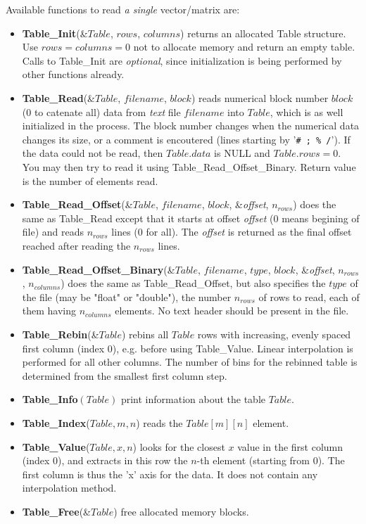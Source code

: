 Available functions to read \emph{a single} vector/matrix are:
\begin{itemize}
\item {\bf Table\_Init}(\&$Table$, $rows$, $columns$) returns an allocated
  Table structure. Use $rows=columns=0$ not to allocate memory and return an empty table.
  Calls to Table\_Init are \emph{optional}, since initialization is being
  performed by other functions already.
\item {\bf Table\_Read}(\&$Table$, $filename$, $block$)
  reads numerical block number
  $block$ (0 to catenate all) data from \emph{text} file $filename$ into $Table$,
  which is as well initialized in the process.
  The block number changes when the numerical data changes its size,
  or a comment is encoutered (lines starting
  by '\verb+# ; % /+'). If the data could not be read,
  then $Table.data$ is NULL and $Table.rows = 0$.
  You may then try to read it using Table\_Read\_Offset\_Binary.
  Return value is the number of elements read.
\item {\bf Table\_Read\_Offset}(\&$Table$, $filename$, $block$, \&\textit{offset}, $n_{rows}$)
  does the same as Table\_Read except that it starts at offset \textit{offset}
  (0 means begining of file) and reads $n_{rows}$ lines (0 for all).
  The \textit{offset} is returned as the final offset reached after
  reading the $n_{rows}$ lines.
\item {\bf Table\_Read\_Offset\_Binary}(\&$Table$, $filename$, $type$,
  $block$, \&\textit{offset}, $n_{rows}$, $n_{columns}$) does the same as
  Table\_Read\_Offset, but also specifies the $type$ of the file (may
  be "float" or "double"), the number $n_{rows}$ of rows to read, each
  of them having $n_{columns}$ elements. No text header should be present
  in the file.
\item {\bf Table\_Rebin}(\&$Table$) rebins all $Table$ rows with increasing, evenly spaced first column (index 0), e.g. before using Table\_Value. Linear interpolation is performed for all other columns. The number of bins for the rebinned table is determined from the smallest first column step.
\item {\bf Table\_Info}$(Table)$ print information about the table $Table$.
\item {\bf Table\_Index}($Table, m, n$) reads the $Table[m][n]$ element.
\item {\bf Table\_Value}($Table, x, n$) looks for the closest $x$
  value in the first column (index 0), and extracts in this row the
  $n$-th element (starting from 0). The first column is thus the 'x' axis for the data. It does not contain any interpolation method.
\item {\bf Table\_Free}(\&$Table$) free allocated memory blocks.
\end{itemize}

